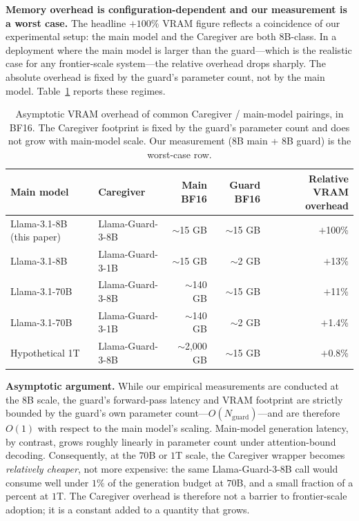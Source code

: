 \documentclass[10pt,letterpaper]{article}
\theoremstyle{definition}
\theoremstyle{plain}
\begin{document}
\textbf{Memory overhead is configuration-dependent and our measurement
is a worst case.} The headline $+100\%$ VRAM figure reflects a
coincidence of our experimental setup: the main model and the
Caregiver are both 8B-class. In a deployment where the main model is
larger than the guard---which is the realistic case for any
frontier-scale system---the relative overhead drops sharply. The
absolute overhead is fixed by the guard's parameter count, not by the
main model. Table~\ref{tab:vram-asymptotic} reports these regimes.

\begin{table}[t]
\centering
\caption{Asymptotic VRAM overhead of common Caregiver / main-model
pairings, in BF16. The Caregiver footprint is fixed by the guard's
parameter count and does not grow with main-model scale. Our
measurement (8B main + 8B guard) is the worst-case row.}
\label{tab:vram-asymptotic}
\begin{tabular}{llrrr}
\toprule
\textbf{Main model} & \textbf{Caregiver} & \textbf{Main BF16} & \textbf{Guard BF16} & \textbf{Relative VRAM overhead} \\
\midrule
Llama-3.1-8B (this paper) & Llama-Guard-3-8B & $\sim$15 GB & $\sim$15 GB & $+$100\% \\
Llama-3.1-8B & Llama-Guard-3-1B & $\sim$15 GB & $\sim$2 GB & $+$13\% \\
Llama-3.1-70B & Llama-Guard-3-8B & $\sim$140 GB & $\sim$15 GB & $+$11\% \\
Llama-3.1-70B & Llama-Guard-3-1B & $\sim$140 GB & $\sim$2 GB & $+$1.4\% \\
Hypothetical 1T & Llama-Guard-3-8B & $\sim$2{,}000 GB & $\sim$15 GB & $+$0.8\% \\
\bottomrule
\end{tabular}
\end{table}

\textbf{Asymptotic argument.} While our empirical measurements are
conducted at the $8$B scale, the guard's forward-pass latency and
VRAM footprint are strictly bounded by the guard's own parameter
count---$O(N_\text{guard})$---and are therefore $O(1)$ with respect
to the main model's scaling. Main-model generation latency, by
contrast, grows roughly linearly in parameter count under
attention-bound decoding. Consequently, at the $70$B or $1$T scale,
the Caregiver wrapper becomes \emph{relatively cheaper}, not more
expensive: the same Llama-Guard-3-8B call would consume well under
$1\%$ of the generation budget at $70$B, and a small fraction of a
percent at $1$T. The Caregiver overhead is therefore not a barrier
to frontier-scale adoption; it is a constant added to a quantity
that grows.
\end{document}
